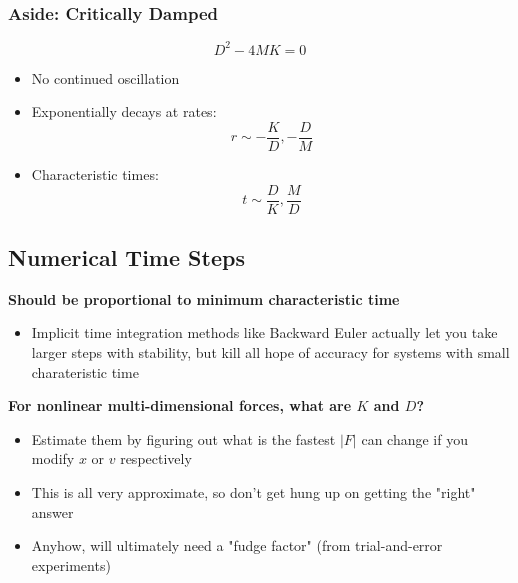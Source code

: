 \documentclass{article}
\begin{document}
\subsubsection*{Aside: Critically Damped}
\[D^2 - 4MK = 0\]
\begin{itemize}
    \item No continued oscillation
    \item Exponentially decays at rates: 
    \[r \sim -\frac{K}{D}, -\frac{D}{M}\]
    \item Characteristic times:
    \[t \sim \frac{D}{K}, \frac{M}{D}\]
\end{itemize}

\subsection*{Numerical Time Steps}
\textbf{Should be proportional to minimum characteristic time}
\begin{itemize}
    \item Implicit time integration methods like Backward Euler actually let you take larger steps with stability, but kill all hope of accuracy for systems with small charateristic time
\end{itemize}
\textbf{For nonlinear multi-dimensional forces, what are $K$ and $D$?}
\begin{itemize}
    \item Estimate them by figuring out what is the fastest $\vert F \vert$ can change if you modify $x$ or $v$ respectively
    \item This is all very approximate, so don't get hung up on getting the "right" answer
    \item Anyhow, will ultimately need a "fudge factor" (from trial-and-error experiments)
\end{itemize}

\pagebreak
\end{document}
